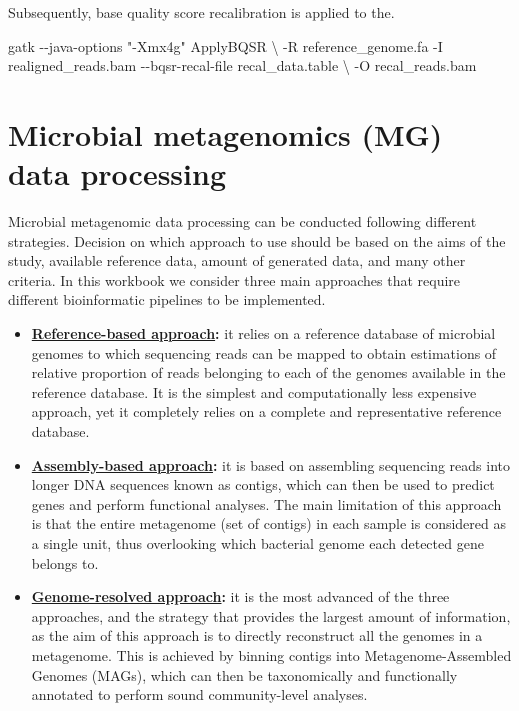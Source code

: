 \documentclass[
]{book}
\newenvironment{Shaded}{\begin{snugshade}}{\end{snugshade}}
\newcommand{\AttributeTok}[1]{\textcolor[rgb]{0.13,0.29,0.53}{#1}}
\newcommand{\DataTypeTok}[1]{\textcolor[rgb]{0.13,0.29,0.53}{#1}}
\newcommand{\ExtensionTok}[1]{#1}
\newcommand{\NormalTok}[1]{#1}
\newcommand{\StringTok}[1]{\textcolor[rgb]{0.31,0.60,0.02}{#1}}
\providecommand{\tightlist}{%
  \setlength{\itemsep}{0pt}\setlength{\parskip}{0pt}}
\begin{document}
\normalsize

Subsequently, base quality score recalibration is applied to the.
\small

\begin{Shaded}
\begin{Highlighting}[]
\ExtensionTok{gatk} \AttributeTok{{-}{-}java{-}options} \StringTok{"{-}Xmx4g"}\NormalTok{ ApplyBQSR }\DataTypeTok{\textbackslash{}}
    \AttributeTok{{-}R}\NormalTok{ reference\_genome.fa}
    \ExtensionTok{{-}I}\NormalTok{ realigned\_reads.bam}
    \ExtensionTok{{-}{-}bqsr{-}recal{-}file}\NormalTok{ recal\_data.table }\DataTypeTok{\textbackslash{}}
    \AttributeTok{{-}O}\NormalTok{ recal\_reads.bam}
\end{Highlighting}
\end{Shaded}

\normalsize

\hypertarget{microbial-metagenomics-data-processing}{%
\chapter{Microbial metagenomics (MG) data processing}\label{microbial-metagenomics-data-processing}}

Microbial metagenomic data processing can be conducted following different strategies. Decision on which approach to use should be based on the aims of the study, available reference data, amount of generated data, and many other criteria. In this workbook we consider three main approaches that require different bioinformatic pipelines to be implemented.

\begin{itemize}
\tightlist
\item
  \textbf{\protect\hyperlink{reference-based}{Reference-based approach}:} it relies on a reference database of microbial genomes to which sequencing reads can be mapped to obtain estimations of relative proportion of reads belonging to each of the genomes available in the reference database. It is the simplest and computationally less expensive approach, yet it completely relies on a complete and representative reference database.
\item
  \textbf{\protect\hyperlink{assembly-based}{Assembly-based approach}:} it is based on assembling sequencing reads into longer DNA sequences known as contigs, which can then be used to predict genes and perform functional analyses. The main limitation of this approach is that the entire metagenome (set of contigs) in each sample is considered as a single unit, thus overlooking which bacterial genome each detected gene belongs to.
\item
  \textbf{\protect\hyperlink{genome-resolved}{Genome-resolved approach}:} it is the most advanced of the three approaches, and the strategy that provides the largest amount of information, as the aim of this approach is to directly reconstruct all the genomes in a metagenome. This is achieved by binning contigs into Metagenome-Assembled Genomes (MAGs), which can then be taxonomically and functionally annotated to perform sound community-level analyses.
\end{itemize}
\end{document}
